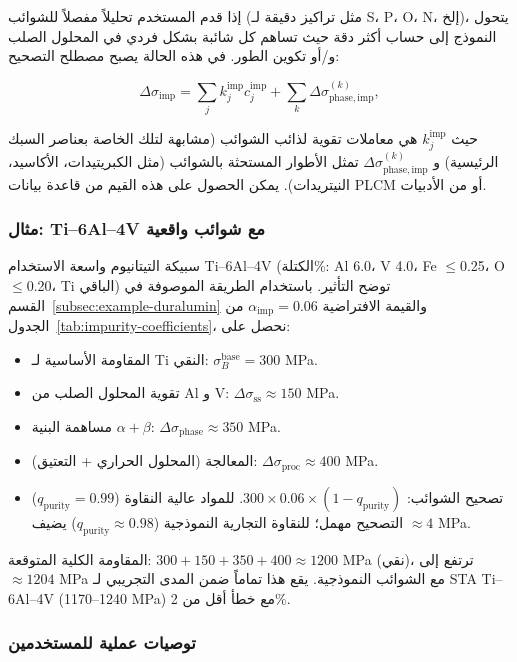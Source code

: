 \documentclass[11pt,a4paper]{article}
\begin{document}
\begin{otherlanguage}{arabic}
		إذا قدم المستخدم تحليلاً مفصلاً للشوائب (مثل تراكيز دقيقة لـ S، P، O، N، إلخ)، يتحول النموذج إلى حساب أكثر دقة حيث تساهم كل شائبة بشكل فردي في المحلول الصلب و/أو تكوين الطور. في هذه الحالة يصبح مصطلح التصحيح:
		
		\[
		\Delta\sigma_{\mathrm{imp}} = \sum_{j} k_j^{\mathrm{imp}} c_j^{\mathrm{imp}} + \sum_{k} \Delta\sigma_{\mathrm{phase,imp}}^{(k)},
		\]
		
		حيث \(k_j^{\mathrm{imp}}\) هي معاملات تقوية لذائب الشوائب (مشابهة لتلك الخاصة بعناصر السبك الرئيسية) و \(\Delta\sigma_{\mathrm{phase,imp}}^{(k)}\) تمثل الأطوار المستحثة بالشوائب (مثل الكبريتيدات، الأكاسيد، النيتريدات). يمكن الحصول على هذه القيم من قاعدة بيانات PLCM أو من الأدبيات.
		
		\subsubsection*{مثال: Ti--6Al--4V مع شوائب واقعية}
		
		سبيكة التيتانيوم واسعة الاستخدام Ti--6Al--4V (الكتلة\%: Al 6.0، V 4.0، Fe \(\le\)0.25، O \(\le\)0.20، Ti الباقي) توضح التأثير. باستخدام الطريقة الموصوفة في القسم~\ref{subsec:example-duralumin} والقيمة الافتراضية \(\alpha_{\mathrm{imp}}=0.06\) من الجدول~\ref{tab:impurity-coefficients}، نحصل على:
		
		\begin{itemize}
			\item المقاومة الأساسية لـ Ti النقي: \(\sigma_B^{\mathrm{base}} = 300\) MPa.
			\item تقوية المحلول الصلب من Al و V: \(\Delta\sigma_{\mathrm{ss}} \approx 150\) MPa.
			\item مساهمة البنية \(\alpha+\beta\): \(\Delta\sigma_{\mathrm{phase}} \approx 350\) MPa.
			\item المعالجة (المحلول الحراري + التعتيق): \(\Delta\sigma_{\mathrm{proc}} \approx 400\) MPa.
			\item تصحيح الشوائب: \(300 \times 0.06 \times (1 - q_{\mathrm{purity}})\). للمواد عالية النقاوة (\(q_{\mathrm{purity}}=0.99\)) التصحيح مهمل؛ للنقاوة التجارية النموذجية (\(q_{\mathrm{purity}}\approx 0.98\)) يضيف \(\approx 4\) MPa.
		\end{itemize}
		
		المقاومة الكلية المتوقعة: \(300+150+350+400 \approx 1200\) MPa (نقي)، ترتفع إلى \(\approx 1204\) MPa مع الشوائب النموذجية. يقع هذا تماماً ضمن المدى التجريبي لـ STA Ti–6Al–4V (1170–1240 MPa) مع خطأ أقل من 2\%.
		
		\subsubsection*{توصيات عملية للمستخدمين}
		

\end{otherlanguage}
\end{document}
